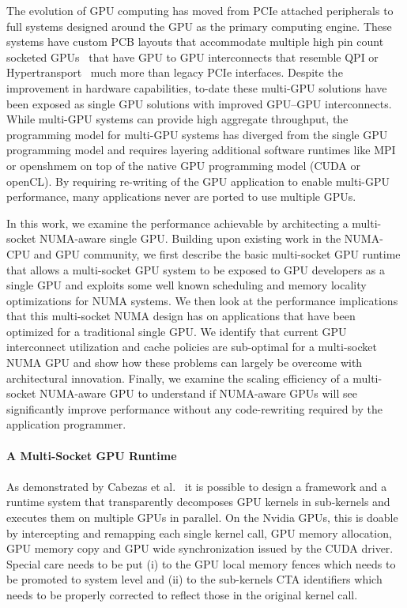 The evolution of GPU computing has moved from PCIe attached peripherals to full 
systems designed around the GPU as the primary computing engine.  These systems 
have custom PCB layouts that accommodate multiple high pin count socketed 
GPUs~\cite{DGX} that have GPU to GPU interconnects that resemble QPI or 
Hypertransport~\cite{INTELQPI,AMDHT} much more than legacy PCIe interfaces.  
Despite the improvement in hardware capabilities, to-date these multi-GPU 
solutions have been exposed as single GPU solutions with improved GPU--GPU 
interconnects.  While multi-GPU systems can provide high aggregate throughput, 
the programming model for multi-GPU systems has diverged from the single GPU 
programming model and requires layering additional software runtimes like MPI 
or openshmem on top of the native GPU programming model (CUDA or openCL).  By 
requiring re-writing of the GPU application to enable multi-GPU performance, 
many applications never are ported to use multiple GPUs.

In this work, we examine the performance achievable by architecting a 
multi-socket NUMA-aware single GPU.  Building upon existing work in the 
NUMA-CPU and GPU community, we first describe the basic multi-socket GPU runtime 
that allows a multi-socket GPU system to be exposed to GPU developers as a 
single GPU and exploits some well known scheduling and memory locality 
optimizations for NUMA systems. We then look at the performance implications 
that this multi-socket NUMA design has on applications that have been optimized 
for a traditional single GPU.  We identify that current GPU interconnect 
utilization and cache policies are sub-optimal for a multi-socket NUMA GPU and 
show how these problems can largely be overcome with architectural innovation.  
Finally, we examine the scaling efficiency of a multi-socket NUMA-aware GPU to 
understand if NUMA-aware GPUs will see significantly improve performance  
without any code-rewriting required by the application programmer.
\\\\
\textbf{A Multi-Socket GPU Runtime}
\\\\
\noindent As demonstrated by Cabezas et al.~\cite{Cabezas2015} it is possible 
to design a framework and a runtime system that transparently decomposes GPU 
kernels in sub-kernels and executes them on multiple GPUs in parallel. On the 
Nvidia GPUs, this is doable by intercepting and remapping each single kernel 
call, GPU memory allocation, GPU memory copy and GPU wide synchronization issued 
by the CUDA driver. Special care needs to be put (i) to the GPU local memory 
fences which needs to be promoted to system level and (ii) to the 
sub-kernels CTA identifiers which needs to be properly corrected to 
reflect those in the original kernel call. 
 
